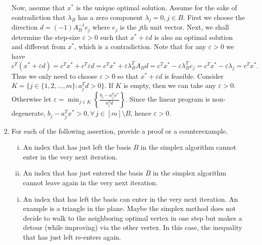 \documentclass[11pt]{article}
\begin{document}
\begin{enumerate}[1)]
\begin{solution}
Now, assume that $x^\ast$ is the unique optimal solution. Assume for the sake of contradiction that $\lambda_B$ has a zero component $λ_j = 0, j\in B$. 
First we choose the direction $d= (−1)A^{−1}_B e_j$ where $e_j$ is the $j$th unit vector. 
Next, we shall determine the step-size $\varepsilon >0$ such that $x^
\ast+ \varepsilon d$ is also an optimal solution and different from $x^*$, which is a contradiction. 
Note that for any $\varepsilon>0$ we have
$$c^T (x^\ast+ \varepsilon d) = c^T x^\ast+ c^T \varepsilon d= c^T x^\ast+ \varepsilon λ_B^T A_B d= c^T x^\ast- \varepsilon λ_B^T e_j= c^T x^\ast - \varepsilon \lambda_j = c^T x^\ast.$$
Thus we only need to choose $\varepsilon > 0$ so that $x^* + \varepsilon d$ is feasible. Consider $K = \{j \in \{1, 2, \dots, m\}: a_j^T d > 0\}$. If $K$ is empty, then we can take any $\varepsilon > 0$. Otherwise let $\varepsilon = \min_{j\in K}\left\{\frac{b_j - a_j^T x^*}{a_j^T d}\right\}$. Since the linear program is non-degenerate, $b_j - a_j^T x^*>0, \forall\,j \in [m]\setminus B$, hence $\varepsilon>0$. 


\end{solution}


\item For each of the following assertion, provide a proof or a counterexample. 
  \begin{enumerate}[i)]
  \item An index that has just left the basis $B$ in the simplex
    algorithm cannot enter in the very next iteration.
  \item An index that has just entered the basis $B$ in the simplex
    algorithm cannot leave again in the very next iteration. 
  \end{enumerate}
  
  
  
  \begin{solution}
   \begin{enumerate}[i)]
  \item An index that has left the basis can enter in the very next iteration. An example is a triangle
in the plane. Maybe the simplex method does not decide to walk to the neighboring optimal
vertex in one step but makes a detour (while improving) via the other vertex. In this case, the
inequality that has just left re-enters again.
  

\end{enumerate}
\end{solution}
\end{enumerate}
\end{document}
